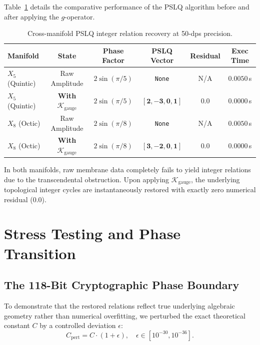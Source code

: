 \documentclass[11pt,a4paper]{article}
\theoremstyle{definition}
\begin{document}
Table~\ref{tab:pslq_benchmark} details the comparative performance of the PSLQ algorithm before and after applying the $g$-operator.

\begin{table}[htbp]
\centering
\caption{Cross-manifold PSLQ integer relation recovery at 50-dps precision.}
\label{tab:pslq_benchmark}
\small
\begin{tabular}{lccccc}
\toprule
\textbf{Manifold} & \textbf{State} & \textbf{Phase Factor} & \textbf{PSLQ Vector} & \textbf{Residual} & \textbf{Exec Time} \\
\midrule
$X_5$ (Quintic) & Raw Amplitude & $2\sin(\pi/5)$ & \texttt{None} & N/A & $0.0050$\,s \\
$X_5$ (Quintic) & \textbf{With $\mathcal{K}_{\text{gauge}}$} & $2\sin(\pi/5)$ & $\mathbf{[2, -3, 0, 1]}$ & $\mathbf{0.0}$ & $\mathbf{0.0000}$\,s \\
\midrule
$X_8$ (Octic) & Raw Amplitude & $2\sin(\pi/8)$ & \texttt{None} & N/A & $0.0050$\,s \\
$X_8$ (Octic) & \textbf{With $\mathcal{K}_{\text{gauge}}$} & $2\sin(\pi/8)$ & $\mathbf{[3, -2, 0, 1]}$ & $\mathbf{0.0}$ & $\mathbf{0.0000}$\,s \\
\bottomrule
\end{tabular}
\end{table}

\noindent In both manifolds, raw membrane data completely fails to yield integer relations due to the transcendental obstruction. Upon applying $\mathcal{K}_{\text{gauge}}$, the underlying topological integer cycles are instantaneously restored with exactly zero numerical residual ($0.0$).

\section{Stress Testing and Phase Transition}

\subsection{The 118-Bit Cryptographic Phase Boundary}
To demonstrate that the restored relations reflect true underlying algebraic geometry rather than numerical overfitting, we perturbed the exact theoretical constant $C$ by a controlled deviation $\epsilon$:
\begin{equation}
C_{\text{pert}} = C \cdot (1 + \epsilon), \quad \epsilon \in [10^{-30}, 10^{-36}].
\end{equation}
\end{document}
